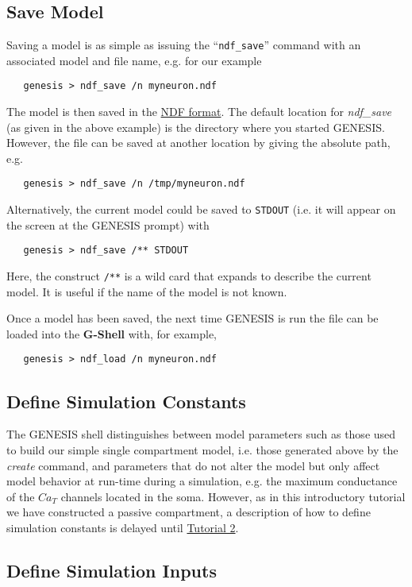 \documentclass[12pt]{article}
\begin{document}
\subsection*{Save Model}

Saving a model is as simple as issuing the ``{\tt ndf\_save}'' command with an associated model and file name, e.g. for our example
\begin{verbatim}
   genesis > ndf_save /n myneuron.ndf
\end{verbatim}
The model is then saved in the \href{../ndf-file-format/ndf-file-format.tex}{NDF format}. The default location for {\it ndf\_save} (as given in the above example) is the directory where you started GENESIS. However, the file can be saved at another location by giving the absolute path, e.g.
\begin{verbatim}
   genesis > ndf_save /n /tmp/myneuron.ndf
\end{verbatim}
Alternatively, the current model could be saved to {\tt STDOUT} (i.e. it will appear on the screen at the GENESIS prompt) with
\begin{verbatim}
   genesis > ndf_save /** STDOUT
\end{verbatim}
Here, the construct {\tt /**} is a wild card that expands to describe the current model. It is useful if the name of the model is not known.

Once a model has been saved, the next time GENESIS is run the file can be loaded into the {\bf G-Shell} with, for example,
\begin{verbatim}
   genesis > ndf_load /n myneuron.ndf
\end{verbatim}

\subsection*{Define Simulation Constants}

The GENESIS shell distinguishes between model parameters such as those used to build our simple single compartment model, i.e. those generated above by the {\it create} command, and parameters that do not alter the model but only affect model behavior at run-time during a simulation, e.g. the maximum conductance of the $Ca_T$ channels located in the soma. However, as in this introductory tutorial we have constructed a passive compartment, a description of how to define simulation constants is delayed until \href{../tutorial2/tutorial2.tex}{Tutorial 2}.  

\subsection*{Define Simulation Inputs}
\end{document}
